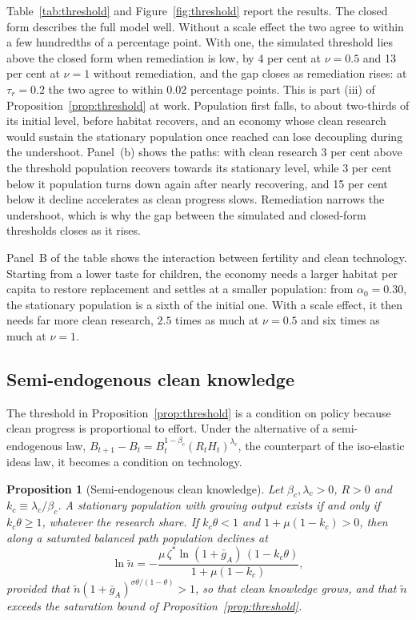 \documentclass[11pt]{article}
\newtheorem{proposition}{Proposition}
\begin{document}
Table~\ref{tab:threshold} and Figure~\ref{fig:threshold} report the results. The closed form describes the
full model well. Without a scale effect the two agree to within a few hundredths of a percentage point.
With one, the simulated threshold lies above the closed form when remediation is low, by 4 per cent at
$\nu=0.5$ and 13 per cent at $\nu=1$ without remediation, and the gap closes as remediation rises: at
$\tau_r=0.2$ the two agree to within $0.02$ percentage points.
This is part (iii) of Proposition~\ref{prop:threshold} at work. Population first falls, to about
two-thirds of its initial level, before habitat recovers, and an economy whose clean research would
sustain the stationary population once reached can lose decoupling during the undershoot. Panel~(b)
shows the paths: with clean research 3 per cent above the threshold population recovers towards its
stationary level, while 3 per cent below it population turns down again after nearly recovering, and
15 per cent below it decline accelerates as clean progress slows. Remediation narrows the undershoot,
which is why the gap between the simulated and closed-form thresholds closes as it rises.

Panel~B of the table shows the interaction between fertility and clean technology. Starting from a lower
taste for children, the economy needs a larger habitat per capita to restore replacement and settles at a
smaller population: from $\alpha_0=0.30$, the stationary population is a sixth of the initial one. With a
scale effect, it then needs far more clean research, $2.5$ times as much at $\nu=0.5$ and six times as
much at $\nu=1$.

\subsection{Semi-endogenous clean knowledge}
\label{sub:semiendog}
The threshold in Proposition~\ref{prop:threshold} is a condition on policy because clean progress is
proportional to effort. Under the alternative of a semi-endogenous law,
$B_{t+1}-B_t=B_t^{1-\beta_c}(R_tH_t)^{\lambda_c}$, the counterpart of the iso-elastic ideas law, it becomes
a condition on technology.

\begin{proposition}[Semi-endogenous clean knowledge]
\label{prop:semiendog}
Let $\beta_c,\lambda_c>0$, $R>0$ and $k_c\equiv\lambda_c/\beta_c$. A stationary population with growing
output exists if and only if $k_c\theta\ge1$, whatever the research share. If $k_c\theta<1$ and
$1+\mu(1-k_c)>0$, then along a saturated balanced path population declines at
\[
\ln\tilde n=-\frac{\mu\,\zeta^\ast\ln(1+\bar g_A)\,(1-k_c\theta)}{1+\mu(1-k_c)} ,
\]
provided that $\tilde n(1+\bar g_A)^{\sigma\theta/(1-\theta)}>1$, so that clean knowledge grows, and that
$\tilde n$ exceeds the saturation bound of Proposition~\ref{prop:threshold}.
\end{proposition}
\end{document}
